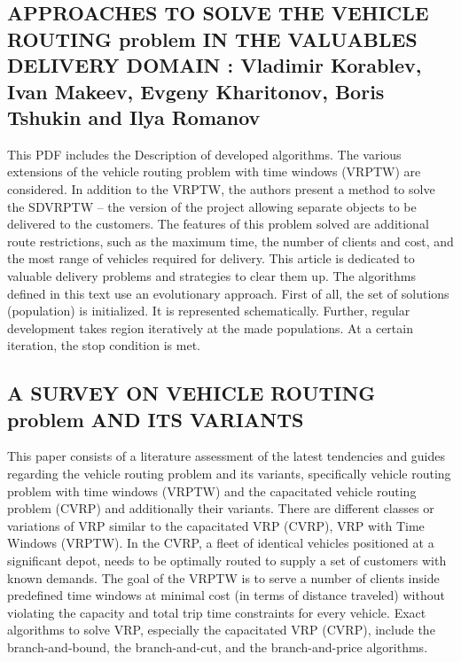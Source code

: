 \documentclass[conference]{IEEEtran}
\begin{document}
\subsection{{\textbf{APPROACHES TO SOLVE THE VEHICLE ROUTING problem IN THE VALUABLES DELIVERY DOMAIN : Vladimir Korablev, Ivan Makeev, Evgeny Kharitonov, Boris Tshukin and Ilya Romanov}}}This PDF includes the Description of developed algorithms. The various extensions of the vehicle routing problem with time windows (VRPTW) are considered. In addition to the VRPTW, the authors present a method to solve the SDVRPTW – the version of the project allowing separate objects to be delivered to the customers. The features of this problem solved are additional route restrictions, such as the maximum time, the number of clients and cost, and the most range of vehicles required for delivery. This article is dedicated to valuable delivery problems and strategies to clear them up. The algorithms defined in this text use an evolutionary approach. First of all, the set of solutions (population) is initialized. It is represented schematically. Further, regular development takes region iteratively at the made populations. At a certain iteration, the stop condition is met.\\

\subsection{{\textbf{A SURVEY ON VEHICLE ROUTING problem AND ITS VARIANTS}}}

This paper consists of a literature assessment of the latest tendencies and guides regarding the vehicle routing problem and its variants, specifically vehicle routing problem with time windows (VRPTW) and the capacitated vehicle routing problem (CVRP) and additionally their variants. There are different classes or variations of VRP similar to the capacitated VRP (CVRP), VRP with Time Windows (VRPTW). In the
CVRP, a fleet of identical vehicles positioned at a significant depot, needs to be optimally routed to supply a set of customers with known demands. The goal of the VRPTW is to serve a number of clients inside predefined time windows at minimal cost (in terms of distance traveled) without violating the capacity and total trip time constraints for every vehicle. Exact algorithms to solve VRP, especially the capacitated VRP (CVRP), include the branch-and-bound, the branch-and-cut, and the branch-and-price algorithms.
\\
\end{document}
